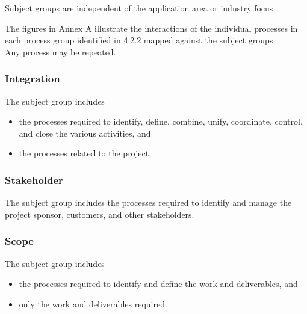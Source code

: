 \documentclass[letterpaper,10pt,english]{jupyterBook}
\begin{document}
\sphinxAtStartPar
Subject groups are independent of the application area or industry focus.

\sphinxAtStartPar
The figures in Annex A illustrate the interactions of the individual processes in each process group identified in 4.2.2 mapped against the subject groups. \\
Any process may be repeated.


\subsubsection{Integration}
\label{\detokenize{PM/pm-processes:integration}}
\sphinxAtStartPar
The  subject group includes
\begin{itemize}
\item {} 
\sphinxAtStartPar
the processes required to identify, define, combine, unify, coordinate, control, and close the various activities, and

\item {} 
\sphinxAtStartPar
the processes related to the project.

\end{itemize}


\subsubsection{Stakeholder}
\label{\detokenize{PM/pm-processes:stakeholder}}
\sphinxAtStartPar
The  subject group includes the processes required to identify and manage the project sponsor, customers, and other stakeholders.


\subsubsection{Scope}
\label{\detokenize{PM/pm-processes:scope}}
\sphinxAtStartPar
The  subject group includes
\begin{itemize}
\item {} 
\sphinxAtStartPar
the processes required to identify and define the work and deliverables, and

\item {} 
\sphinxAtStartPar
only the work and deliverables required.

\end{itemize}
\end{document}
